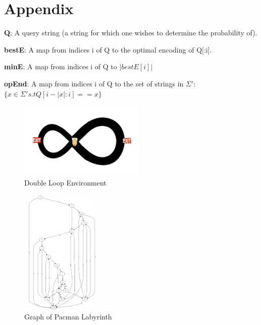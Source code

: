 
\section{Appendix}


\textbf{Q}: A query string (a string for which one wishes to determine the probability of).

\textbf{bestE}: A map from indices i of Q to the optimal encoding of Q[:i].

\textbf{minE}: A map from indices i of Q to $|bestE[i]|$

\textbf{opEnd}: A map from indices i of Q to the set of strings in $\Sigma'$: $\{x \in \Sigma' s.t Q[i-|x|:i] == x\}$


\begin{figure}[ht!]
\centering
\includegraphics[width=60mm]{uCOREPICS/DL/doubleLoopImage.png}
\caption{Double Loop Environment\label{overflow}}
\end{figure}

\begin{figure}[ht!]
\centering
\includegraphics[width=40mm,height=60mm]{uCOREPICS/Pacman/graphPacMan.png}
\caption{Graph of Pacman Labyrinth\label{overflow}}
\end{figure}

